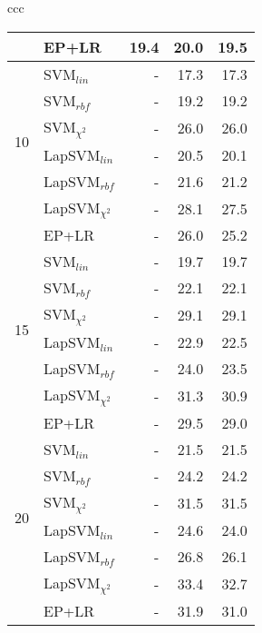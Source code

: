 \documentclass[journal,11pt]{IEEEtran}
\begin{document}
\begin{center}
{\begin{tabular}{ccc}
\begin{tabular}{|r|l|rrr|}
& EP+LR							& 19.4 & 20.0 & 19.5 \\
\hline
\multirow{6}{*}{10}
& SVM$_{lin}$ 	 		& - & 17.3 & 17.3 \\
& SVM$_{rbf}$ 	 		& - & 19.2 & 19.2 \\
& SVM$_{\chi^2}$ 		& - & 26.0 & 26.0 \\
& LapSVM$_{lin}$ 	 	& - & 20.5 & 20.1 \\
& LapSVM$_{rbf}$ 	 	& - & 21.6 & 21.2 \\
& LapSVM$_{\chi^2}$ & - & 28.1 & 27.5 \\
& EP+LR							& - & 26.0 & 25.2 \\
\hline
\multirow{6}{*}{15}
& SVM$_{lin}$ 	 		& - & 19.7 & 19.7 \\
& SVM$_{rbf}$ 	 		& - & 22.1 & 22.1 \\
& SVM$_{\chi^2}$ 		& - & 29.1 & 29.1 \\
& LapSVM$_{lin}$ 	 	& - & 22.9 & 22.5 \\
& LapSVM$_{rbf}$ 	 	& - & 24.0 & 23.5 \\
& LapSVM$_{\chi^2}$ & - & 31.3 & 30.9 \\
& EP+LR							& - & 29.5 & 29.0 \\
\hline
\multirow{6}{*}{20}
& SVM$_{lin}$ 	 		& - & 21.5 & 21.5 \\
& SVM$_{rbf}$ 	 		& - & 24.2 & 24.2 \\
& SVM$_{\chi^2}$ 		& - & 31.5 & 31.5 \\
& LapSVM$_{lin}$ 	 	& - & 24.6 & 24.0 \\
& LapSVM$_{rbf}$ 	 	& - & 26.8 & 26.1 \\
& LapSVM$_{\chi^2}$ & - & 33.4 & 32.7 \\
& EP+LR							& - & 31.9 & 31.0 \\
\hline
\end{tabular}


\\
\end{tabular}

}
\end{center}
\end{document}
